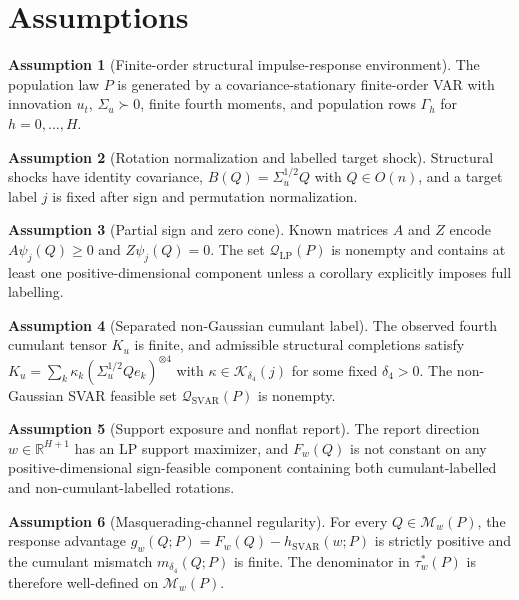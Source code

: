 \documentclass[11pt]{article}
\newcommand{\R}{\mathbb{R}}
\theoremstyle{definition}
\newtheorem{assumption}{Assumption}
\theoremstyle{plain}
\theoremstyle{remark}
\begin{document}
\section{Assumptions}
\begin{assumption}[Finite-order structural impulse-response environment]\label{ass:finite-var}
The population law \(P\) is generated by a covariance-stationary finite-order VAR with innovation \(u_t\), \(\Sigma_u\succ0\), finite fourth moments, and population rows \(\Gamma_h\) for \(h=0,\ldots,H\).
\end{assumption}

\begin{assumption}[Rotation normalization and labelled target shock]\label{ass:normalization}
Structural shocks have identity covariance, \(B(Q)=\Sigma_u^{1/2}Q\) with \(Q\in O(n)\), and a target label \(j\) is fixed after sign and permutation normalization.
\end{assumption}

\begin{assumption}[Partial sign and zero cone]\label{ass:sign-zero}
Known matrices \(A\) and \(Z\) encode \(A\psi_j(Q)\ge0\) and \(Z\psi_j(Q)=0\).  The set \(\mathcal Q_{\mathrm{LP}}(P)\) is nonempty and contains at least one positive-dimensional component unless a corollary explicitly imposes full labelling.
\end{assumption}

\begin{assumption}[Separated non-Gaussian cumulant label]\label{ass:cumulant-label}
The observed fourth cumulant tensor \(K_u\) is finite, and admissible structural completions satisfy \(K_u=\sum_k\kappa_k(\Sigma_u^{1/2}Qe_k)^{\otimes4}\) with \(\kappa\in\mathcal K_{\delta_4}(j)\) for some fixed \(\delta_4>0\).  The non-Gaussian SVAR feasible set \(\mathcal Q_{\mathrm{SVAR}}(P)\) is nonempty.
\end{assumption}

\begin{assumption}[Support exposure and nonflat report]\label{ass:support-exposure}
The report direction \(w\in\R^{H+1}\) has an LP support maximizer, and \(F_w(Q)\) is not constant on any positive-dimensional sign-feasible component containing both cumulant-labelled and non-cumulant-labelled rotations.
\end{assumption}

\begin{assumption}[Masquerading-channel regularity]\label{ass:masq-regular}
For every \(Q\in\mathcal M_w(P)\), the response advantage \(g_w(Q;P)=F_w(Q)-h_{\mathrm{SVAR}}(w;P)\) is strictly positive and the cumulant mismatch \(m_{\delta_4}(Q;P)\) is finite.  The denominator in \(\tau_w^*(P)\) is therefore well-defined on \(\mathcal M_w(P)\).
\end{assumption}
\end{document}
